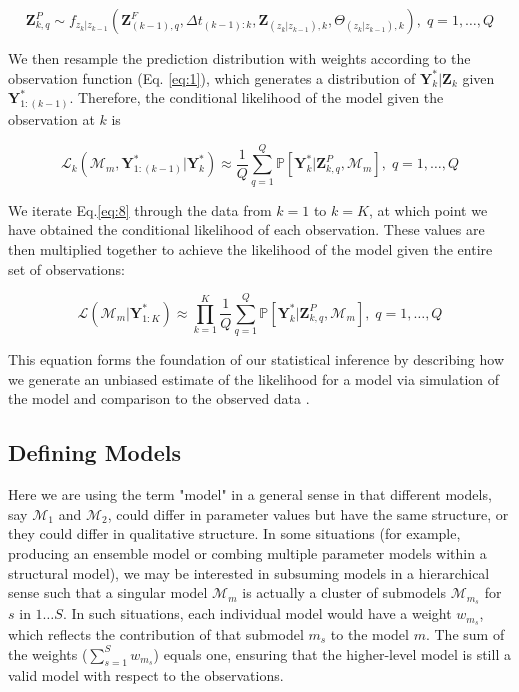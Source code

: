 \documentclass{article}
\begin{document}
\begin{equation}
\label{eq:7}
\textbf{Z}^{P}_{k,q} \sim f_{z_k|z_{k-1}}(\textbf{Z}^{F}_{(k-1),q}, \Delta t_{(k-1):k}, \textbf{Z}_{(z_k|z_{k-1}), k},\Theta_{(z_k|z_{k-1}), k}), \; q = 1, \ldots, Q
\end{equation}

We then resample the prediction distribution with weights according to the observation function (Eq. \ref{eq:1}), which generates a distribution of $\textbf{Y}^{*}_{k}|\textbf{Z}_{k}$ given $\textbf{Y}^{*}_{1:(k-1)}$. Therefore, the conditional likelihood of the model given the observation at $k$ is

\begin{equation}
\label{eq:8}
\mathcal{L}_k(\mathcal{M}_m, \textbf{Y}^{*}_{1:(k-1)} | \textbf{Y}^{*}_{k}) \approx \frac{1}{Q}\sum_{q=1}^{Q}{\mathbb{P}[\textbf{Y}^*_k|\textbf{Z}^{P}_{k, q}, \mathcal{M}_m]}, \; q = 1, \ldots, Q
\end{equation}

We iterate Eq.\ref{eq:8} through the data from $k = 1$ to $k = K$, at which point we have obtained the conditional likelihood of each observation. These values are then multiplied together to achieve the likelihood of the model given the entire set of observations:

\begin{equation}
\label{eq:9}
\mathcal{L}(\mathcal{M}_m | \textbf{Y}^{*}_{1:K}) \approx \prod_{k = 1}^{K}{\frac{1}{Q}\sum_{q=1}^{Q}{\mathbb{P}[\textbf{Y}^*_k|\textbf{Z}^{P}_{k, q}, \mathcal{M}_m]}}, \; q = 1, \ldots, Q
\end{equation}

This equation forms the foundation of our statistical inference by describing how we generate an unbiased estimate of the likelihood for a model via simulation of the model and comparison to the observed data \citep{Doucet2001, King2016}.

\subsection{Defining Models}
\label{subsec:devmods_md}

Here we are using the term "model" in a general sense in that different models, say $\mathcal{M}_1$ and $\mathcal{M}_2$, could differ in parameter values but have the same structure, or they could differ in qualitative structure. In some situations (for example, producing an ensemble model or combing multiple parameter models within a structural model), we may be interested in subsuming models in a hierarchical sense such that a singular model $\mathcal{M}_m$ is actually a cluster of submodels $\mathcal{M}_{m_s}$ for $s$ in $1 \ldots S$. In such situations, each individual model would have a weight $w_{m_s}$, which reflects the contribution of that submodel $m_s$ to the model $m$. The sum of the weights ($\sum_{s = 1}^{S}{w_{m_s}}$) equals one, ensuring that the higher-level model is still a valid model with respect to the observations.
\end{document}
